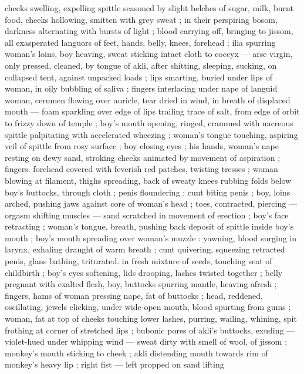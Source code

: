 cheeks swelling, expelling spittle seasoned by slight belches of 
sugar, milk, burnt food, cheeks hollowing, smitten with grey sweat ; 
in their perspiring bosom, darkness alternating with bursts of light ; 
blood carrying off, bringing to jissom, all exasperated languors of 
feet, hands, belly, knees, forehead ; ilia spurring woman's loins, boy 
heaving, sweat sticking intact cloth to coccyx --- arse virgin, only 
pressed, cleaned, by tongue of akli, after shitting, sleeping, sucking, 
on collapsed tent, against unpacked loads ; lips smarting, buried 
under lips of woman, in oily bubbling of saliva ; fingers interlacing 
under nape of languid woman, cerumen flowing over auricle, tear 
dried in wind, in breath of displaced mouth --- foam sparkling over 
edge of lips {\dashcom} trailing trace of salt, from edge of orbit to frizzy 
down of temple ; boy's mouth opening, ringed, crammed with 
nacreous spittle palpitating with accelerated wheezing ; woman's 
tongue touching, aspiring veil of spittle from rosy surface ; boy 
closing eyes ; his hands, woman's nape resting on dewy sand, 
stroking cheeks animated by movement of aspiration ; fingers. 
forehead covered with feverish red patches, twisting tresses ; woman 
blowing at filament, thighs spreading, back of sweaty knees rubbing 
folds below boy's buttocks, through cloth ; penis floundering ; cunt 
biting penis ; boy, loins arched, pushing jaws against core of 
woman's head ; toes, contracted, piercing --- orgasm shifting 
muscles --- sand scratched in movement of erection ; boy's face 
retracting ; woman's tongue, breath, pushing back deposit of spittle 
inside boy's mouth ; boy's mouth spreading over woman's muzzle : 
yawning, blood surging in larynx, exhaling draught of warm breath ; 
cunt quivering, squeezing retracted penis, glans bathing, triturated. 
in fresh mixture of seeds, touching seat of childbirth ; boy's eyes 
softening, lids drooping, lashes twisted together ; belly pregnant with 
exalted flesh, boy, buttocks spurring mantle, heaving afresh ; fingers, 
hams of woman pressing nape, fat of buttocks ; head, reddened, 
oscillating, jewels clicking, under wide-open mouth, blood spurting 
from gums ; woman, fat at top of cheeks touching lower lashes, 
purring, wailing, whining, spit frothing at corner of stretched lips ; 
bubonic pores of akli's buttocks, exuding --- violet-hued under 
whipping wind --- sweat dirty with smell of wool, of jissom ; 
monkey's mouth sticking to cheek ; akli distending mouth towards 
rim of monkey's heavy lip ; right fist --- left propped on sand lifting 
